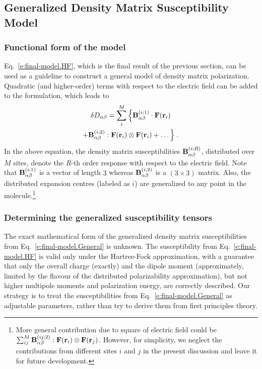 \documentclass[aip,amsmath,amssymb,reprint,floatfix]{revtex4-1}
\begin{document}
\subsection{Generalized Density Matrix Susceptibility Model}

\subsubsection{Functional form of the model}

Eq.~\eqref{e:final-model.HF}, which is the final result of the previous section, 
can be used as a guideline to construct a general model of density matrix polarization.
Quadratic (and higher\hyp{}order) terms with respect to the electric field
can be added to the formulation, which leads to
%
\begin{multline}\label{e:final-model.General}
 \delta D_{\alpha\beta} = \sum_{i }^M \Big\{
                                      {\bf B}^{(i ; 1)}_{\alpha\beta} \cdot {\bf F}({\bf r}_i)  \\
                        +             {\bf B}^{(i ; 2)}_{\alpha\beta} : {\bf F}({\bf r}_i) \otimes {\bf F}({\bf r}_i) 
                        + \ldots \Big\} \;.
\end{multline}
%
In the above equation, the density matrix susceptibilities
${\bf B}^{(i; R)}_{\alpha\beta}$, distributed over $M$ sites,
denote the $R$-th order response with respect to the electric field.
Note that
${\bf B}^{(i; 1)}_{\alpha\beta}$ is a vector of length $3$ whereas ${\bf B}^{(i; 2)}_{\alpha\beta}$
is a $(3\times 3)$ matrix. Also, the distributed expansion centres
(labeled as $i$) are generalized to any point in the molecule.\footnote{More general
contribution due to square of electric field could 
be $\sum_{ij}^M {\bf B}^{(ij; 2)}_{\alpha\beta} : {\bf F}({\bf r}_i) \otimes {\bf F}({\bf r}_j)$. 
However, for simplicity, we neglect the contributions from different sites $i$ and $j$
in the present discussion and leave it for future development.
}

\subsubsection{Determining the generalized susceptibility tensors}

The exact mathematical form of the generalized density matrix susceptibilities 
from Eq.~\eqref{e:final-model.General} is unknown. 
The susceptibility from Eq.~\eqref{e:final-model.HF} is valid only under the Hartree\hyp{}Fock
approximation, with a guarantee that only the overall charge (exactly) and the dipole moment (approximately,
limited by the flavour of the distributed polarizability approximation), 
but not higher multipole moments and polarization energy, are correctly described.
Our strategy is to treat the susceptibilities from Eq.~\eqref{e:final-model.General}
as adjustable parameters, rather than try to derive them from first principles theory.
\end{document}
